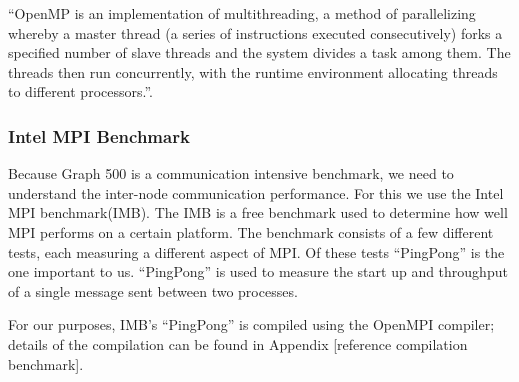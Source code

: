 ``OpenMP is an implementation of multithreading, a method of parallelizing whereby a master thread (a series of instructions executed consecutively) forks a specified number of slave threads and the system divides a task among them. The threads then run concurrently, with the runtime environment allocating threads to different processors.''\cite{openmp}.


\subsubsection{Intel MPI Benchmark}
\label{tools-imb}
Because Graph 500 is a communication intensive benchmark, we need to understand the inter-node communication performance. For this we use the Intel MPI benchmark(IMB).  
The IMB is a free benchmark used to determine how well MPI performs on a certain platform. The benchmark consists of a few different tests, each measuring a different aspect of MPI. Of these tests ``PingPong'' is the one important to us. ``PingPong'' is used to measure the start up and throughput of a single message sent between two processes\cite{img-userguide}.

For our purposes, IMB's ``PingPong'' is compiled using the OpenMPI compiler; details of the compilation can be found in Appendix [reference compilation benchmark].

